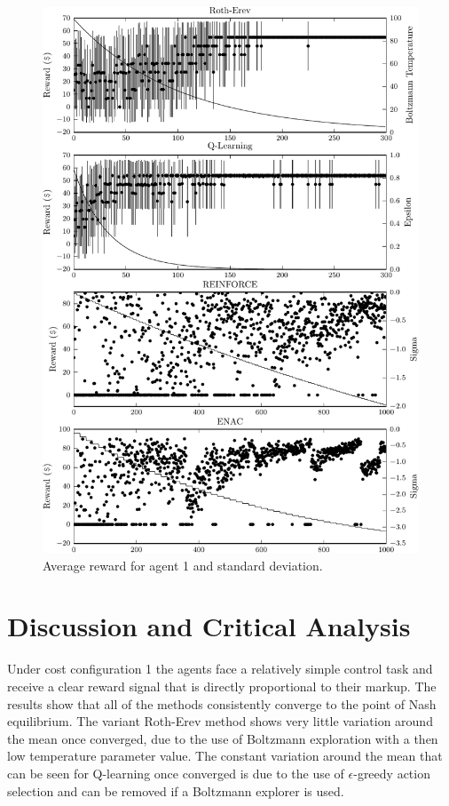 {\begin{figure}
	  \includegraphics{figures/fig5_2_reward_a1}
	  \caption{Average reward for agent 1 and standard deviation.}
	  \label{fig:5_2_reward_a1}
	\end{figure}
}{}

\section{Discussion and Critical Analysis}
Under cost configuration 1 the agents face a relatively simple control task and
receive a clear reward signal that is directly proportional to their markup. The
results show that all of the methods consistently converge to the point of Nash
equilibrium.  The variant Roth-Erev method shows very little variation
around the mean once converged, due to the use of Boltzmann exploration with a
then low temperature parameter value.  The constant variation around the mean
that can be seen for Q-learning once converged is due to the use of
$\epsilon$-greedy action selection and can be removed if a Boltzmann explorer
is used.

